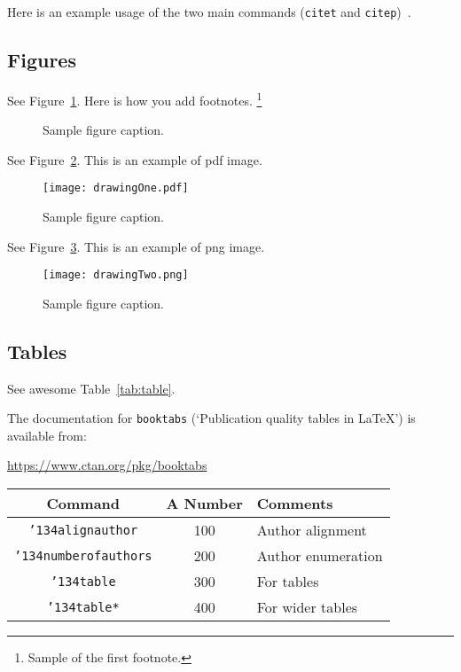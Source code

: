 \documentclass[review]{styles/stucosrec_article}
\begin{document}
	Here is an example usage of the two main commands (\verb+citet+ and \verb+citep+)~\cite{vrbancic2019transfer}.
	
	\subsection{Figures}
	\lipsum[10]
	See Figure~\ref{fig:fig1}. Here is how you add footnotes. \footnote{Sample of the first footnote.}
	\lipsum[11]
	
	\begin{figure}[H]
		\centering
		\fbox{\rule[-.5cm]{4cm}{4cm} \rule[-.5cm]{4cm}{0cm}}
		\caption{Sample figure caption.}
		\label{fig:fig1}
	\end{figure}

	See Figure~\ref{fig:fig2}. This is an example of pdf image.

	\begin{figure}[b!]
		\centering
		\texttt{[image: drawingOne.pdf]}
		\caption{Sample figure caption.}
		\label{fig:fig2}
	\end{figure}

	See Figure~\ref{fig:fig3}. This is an example of png image.
	
	\begin{figure}[H]
		\centering
		\texttt{[image: drawingTwo.png]}
		\caption{Sample figure caption.}
		\label{fig:fig3}
	\end{figure}

	\subsection{Tables}
	See awesome Table~\ref{tab:table}.
	
	The documentation for \verb+booktabs+ (`Publication quality tables in LaTeX') is available from:
	\begin{center}
		\url{https://www.ctan.org/pkg/booktabs}
	\end{center}	
	
	\begin{table*}
		\centering
		\caption{Some Typical Commands}
		\label{tab:table}
		\begin{tabular}{|c|c|l|} \hline
			Command&A Number&Comments\\ \hline
			\texttt{{\char'134}alignauthor} & 100& Author alignment\\ \hline
			\texttt{{\char'134}numberofauthors}& 200& Author enumeration\\ \hline
			\texttt{{\char'134}table}& 300 & For tables\\ \hline
			\texttt{{\char'134}table*}& 400& For wider tables\\ \hline
		\end{tabular}
	\end{table*}
\end{document}
